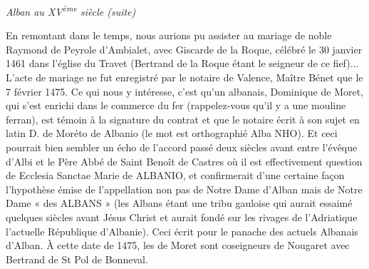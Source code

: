 \begin{center}
    {\Large\itshape Alban au XV\textsuperscript{ème} siècle (suite)}
\end{center}

\bigskip

En remontant dans le temps, nous aurions pu assister au mariage de noble Raymond de Peyrole d'Ambialet, avec Giscarde de la Roque, célébré le 30 janvier 1461 dans l'église du Travet (Bertrand de la Roque étant le seigneur de ce fief)... L'acte de mariage ne fut enregistré par le notaire de Valence, Maître Bénet que le 7 février 1475. Ce qui nous y intéresse, c'est qu'un albanais, Dominique de Moret, qui s'est enrichi dans le commerce du fer (rappelez-vous qu'il y a une mouline ferran), est témoin à la signature du contrat et que le notaire écrit à son sujet en latin D. de Moréto de Albanio (le mot est orthographié Alba NHO). Et ceci pourrait bien sembler un écho de l'accord passé deux siècles avant entre l'évêque d'Albi et le Père Abbé de Saint Benoît de Castres où il est effectivement question de Ecclesia Sanctae Marie de ALBANIO, et confirmerait d'une certaine façon l'hypothèse émise de l'appellation non pas de Notre Dame d'Alban mais de Notre Dame « des ALBANS » (les Albans étant une tribu gauloise qui aurait essaimé quelques siècles avant Jésus Christ et aurait fondé sur les rivages de l'Adriatique l'actuelle République d'Albanie). Ceci écrit pour le panache des actuels Albanais d'Alban. À cette date de 1475, les de Moret sont coseigneurs de Nougaret avec Bertrand de St Pol de Bonneval.
